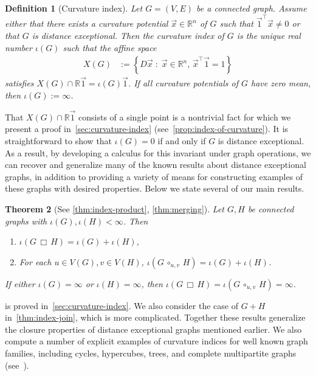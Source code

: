 \documentclass[11pt,a4paper]{article}
\newcommand{\distmatrix}{D}
\newcommand{\x}{\vec{x}}
\newcommand{\one}{\vec{1}}
\newtheorem{theorem}{Theorem}[section]
\newtheorem{definition}[theorem]{Definition}
\newcommand{\Circ}{\circ}
\begin{document}
    \begin{definition}[Curvature index]\label{defn:curvature-index}
        Let $G=(V,E)$ be a connected graph. Assume either that there exists a curvature potential $\x\in\mathbb{R}^{n}$ of $G$ such that $\one^\top\x \ne 0$ or that $G$ is distance exceptional. Then the \emph{curvature index} of $G$ is the unique real number $\iota(G)$ such that the affine space
            \begin{align*}
                X(G) &:= \left\{\distmatrix\x \;:\; \x\in\mathbb{R}^{n},\, \x^\top\one = 1\right\}
            \end{align*}
        satisfies $X(G)\cap\mathbb{R}\one = \iota(G)\one$. If all curvature potentials of $G$ have zero mean, then $\iota(G) := \infty$.
    \end{definition}
    
    That $X(G)\cap\mathbb{R}\one$ consists of a single point is a nontrivial fact for which we present a proof in~\cref{sec:curvature-index} (see~\cref{prop:index-of-curvature}). It is straightforward to show that $\iota(G) = 0$ if and only if $G$ is distance exceptional. As a result, by developing a calculus for this invariant under graph operations, we can recover and generalize many of the known results about distance exceptional graphs, in addition to providing a variety of means for constructing examples of these graphs with desired properties. Below we state several of our main results.

    \begin{theorem}[See \cref{thm:index-product}, \cref{thm:merging}]\label{thm:intro-calculus}
        Let $G, H$ be connected graphs with $\iota(G),\iota(H) < \infty$. Then
            \begin{enumerate}
                \item $\iota(G\,\Box\,H) = \iota(G) + \iota(H)$,
                \item For each $u\in V(G), v\in V(H)$, $\iota(G\,\Circ_{u,v}\, H) = \iota(G) + \iota(H)$.
            \end{enumerate}
        If either $\iota(G) = \infty$ or $\iota(H) = \infty$, then $\iota(G\,\Box\,H) = \iota(G\,\Circ_{u,v}\, H) = \infty$.
    \end{theorem}

     is proved in~\cref{sec:curvature-index}. We also consider the case of $G+ H$ in~\cref{thm:index-join}, which is more complicated. Together these results generalize the closure properties of distance exceptional graphs mentioned earlier. We also compute a number of explicit examples of curvature indices for well known graph families, including cycles, hypercubes, trees, and complete multipartite graphs (see~).
\end{document}
